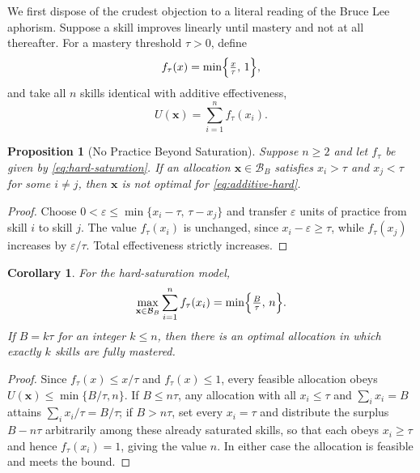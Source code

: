 \documentclass[11pt]{article}
\newtheorem{proposition}[theorem]{Proposition}
\newtheorem{corollary}[theorem]{Corollary}
\theoremstyle{definition}
\theoremstyle{remark}
\newcommand{\vx}{\mathbf{x}}
\newcommand{\simplex}{\mathcal{B}}
\begin{document}
We first dispose of the crudest objection to a literal reading of the
Bruce Lee aphorism.  Suppose a skill improves linearly until mastery
and not at all thereafter.  For a mastery threshold \(\tau>0\), define
\begin{equation}
    f_\tau(x)
    =
    \min\Bigl\{\tfrac{x}{\tau},\,1\Bigr\},
    \label{eq:hard-saturation}
\end{equation}
and take all \(n\) skills identical with additive effectiveness,
\begin{equation}
    U(\vx)
    =
    \sum_{i=1}^n f_\tau(x_i).
    \label{eq:additive-hard}
\end{equation}

\begin{proposition}[No Practice Beyond Saturation]
\label{prop:no-overshoot}
Suppose \(n\geq2\) and let \(f_\tau\) be given by
\eqref{eq:hard-saturation}. If an allocation \(\vx\in\simplex_B\) satisfies
\(x_i>\tau\) and \(x_j<\tau\) for some \(i\neq j\), then \(\vx\) is not
optimal for \eqref{eq:additive-hard}.
\end{proposition}

\begin{proof}
Choose \(0<\varepsilon\leq\min\{x_i-\tau,\,\tau-x_j\}\) and transfer
\(\varepsilon\) units of practice from skill \(i\) to skill \(j\). The value
\(f_\tau(x_i)\) is unchanged, since \(x_i-\varepsilon\geq\tau\), while
\(f_\tau(x_j)\) increases by \(\varepsilon/\tau\). Total effectiveness
strictly increases.
\end{proof}

\begin{corollary}
\label{cor:hard-value}
For the hard-saturation model,
\[
    \max_{\vx\in\simplex_B}
    \sum_{i=1}^n f_\tau(x_i)
    =
    \min\Bigl\{\tfrac{B}{\tau},\,n\Bigr\}.
\]
If \(B=k\tau\) for an integer \(k\leq n\), then there is an optimal
allocation in which exactly \(k\) skills are fully mastered.
\end{corollary}

\begin{proof}
Since \(f_\tau(x)\leq x/\tau\) and \(f_\tau(x)\leq1\), every feasible
allocation obeys \(U(\vx)\leq\min\{B/\tau,n\}\). If \(B\leq n\tau\),
any allocation with all \(x_i\leq\tau\) and \(\sum_i x_i=B\) attains
\(\sum_i x_i/\tau=B/\tau\); if \(B>n\tau\), set every \(x_i=\tau\) and
distribute the surplus \(B-n\tau\) arbitrarily among these already
saturated skills, so that each obeys \(x_i\geq\tau\) and hence
\(f_\tau(x_i)=1\), giving the value \(n\). In either case the
allocation is feasible and meets the bound.
\end{proof}
\end{document}
